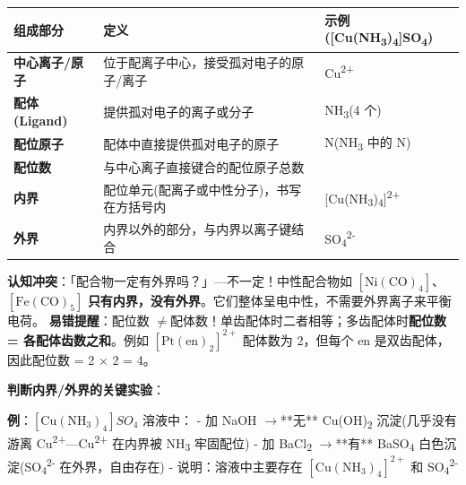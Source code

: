 \documentclass[a4paper,11pt]{ctexart}
\newcounter{none}
\newcommand{\箭}{\ensuremath{\rightarrow}}
\newcommand{\左箭}{\ensuremath{\leftarrow}}
\newcommand{\上箭}{\ensuremath{\uparrow}}
\newcommand{\下箭}{\ensuremath{\downarrow}}
\newcommand{\衡}{\ensuremath{\rightleftharpoons}}
\newcommand{\双箭}{\ensuremath{\leftrightarrow}}
\newcommand{\约等于}{\ensuremath{\approx}}
\newcommand{\小于等于}{\ensuremath{\leq}}
\newcommand{\大于等于}{\ensuremath{\geq}}
\newcommand{\不等于}{\ensuremath{\neq}}
\newcommand{\西格马}{\ensuremath{\sigma}}
\newcommand{\派}{\ensuremath{\pi}}
\begin{document}
{\def\LTcaptype{none} %
\begin{longtable}[]{@{}
  >{\raggedright\arraybackslash}p{}
  >{\raggedright\arraybackslash}p{}
  >{\raggedright\arraybackslash}p{}@{}}
\toprule\noalign{}
\begin{minipage}[b]{\linewidth}\raggedright
组成部分
\end{minipage} & \begin{minipage}[b]{\linewidth}\raggedright
定义
\end{minipage} & \begin{minipage}[b]{\linewidth}\raggedright
示例({[}Cu(NH\textsubscript{3})\textsubscript{4}{]}SO\textsubscript{4})
\end{minipage} \\
\midrule\noalign{}
\endhead
\bottomrule\noalign{}
\endlastfoot
\textbf{中心离子/原子} & 位于配离子中心，接受孤对电子的原子/离子 & Cu\textsuperscript{2+} \\
\textbf{配体 (Ligand)} & 提供孤对电子的离子或分子 & NH\textsubscript{3}(4 个) \\
\textbf{配位原子} & 配体中直接提供孤对电子的原子 & N(NH\textsubscript{3} 中的 N) \\
\textbf{配位数} & 与中心离子直接键合的配位原子总数 & 4 \\
\textbf{内界} & 配位单元(配离子或中性分子)，书写在方括号内 & {[}Cu(NH\textsubscript{3})\textsubscript{4}{]}\textsuperscript{2+} \\
\textbf{外界} & 内界以外的部分，与内界以离子键结合 & SO\textsubscript{4}\textsuperscript{2-} \\
\end{longtable}
}

\textbf{认知冲突}：「配合物一定有外界吗？」---不一定！中性配合物如 \([\mathrm{Ni(CO)_4}]\)、\([\mathrm{Fe(CO)_5}]\) \textbf{只有内界，没有外界}。它们整体呈电中性，不需要外界离子来平衡电荷。
\textbf{易错提醒}：配位数 \不等于 配体数！单齿配体时二者相等；多齿配体时\textbf{配位数 = 各配体齿数之和}。例如 \([\mathrm{Pt(en)_2}]^{2+}\) 配体数为 2，但每个 en 是双齿配体，因此配位数 = 2 × 2 = 4。

\textbf{判断内界/外界的关键实验}：

\textbf{例}：\([\mathrm{Cu(NH_3)_4}]SO_4\) 溶液中：
- 加 NaOH \箭 **无** Cu(OH)\textsubscript{2} 沉淀(几乎没有游离 Cu\textsuperscript{2+}---Cu\textsuperscript{2+} 在内界被 NH\textsubscript{3} 牢固配位)
- 加 BaCl\textsubscript{2} \箭 **有** BaSO\textsubscript{4} 白色沉淀(SO\textsubscript{4}\textsuperscript{2-} 在外界，自由存在)
- 说明：溶液中主要存在 \([\mathrm{Cu(NH_3)_4}]^{2+}\) 和 SO\textsubscript{4}\textsuperscript{2-}
\end{document}
